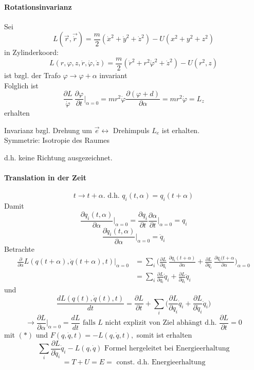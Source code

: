 \documentclass[titlepage,12pt,a4paper,ngerman]{report}
\newcommand{\tx}[1]{\textrm{#1}}
\newcommand{\rbox}[1]{\begin{tcolorbox}[colback=white,colframe=red!75!black]#1\end{tcolorbox}} %
\begin{document}
\paragraph{Rotationsinvarianz}
Sei $$L(\vec{r}, \vec{\dot r}) = \frac{m}{2}(\dot x^2 + \dot y^2 + \dot z^2) - U(x^2+y^2+z^2)$$
in Zylinderkoord: $$L(r, \varphi, z, \dot r, \dot \varphi, \dot z) = \frac{m}{2}(\dot r^2 + r^2 \dot \varphi^2 + \dot z^2) - U(r^2, z)$$
ist bzgl. der Trafo $\varphi \rightarrow \varphi + \alpha$ invariant\\
Folglich ist $$\frac{\partial L}{\dot \varphi}\ \frac{\partial \varphi}{\partial t} \bigg|_{\alpha = 0} = mr^2\dot \varphi \frac{\partial (\varphi+d)}{\partial \alpha} = mr^2 \dot \varphi = L_z$$ erhalten
\rbox{Invarianz bzgl. Drehung um $\vec{e} \leftrightarrow$ Drehimpuls $L_e$ ist erhalten.\\
	Symmetrie: Isotropie des Raumes}
d.h. keine Richtung ausgezeichnet.

\paragraph{Translation in der Zeit}
$$t \rightarrow t + \alpha. \tx{ d.h. } q_i(t,\alpha) = q_i (t+\alpha)$$
Damit $$\frac{\partial q_i(t,\alpha)}{\partial \alpha} \bigg|_{\alpha = 0} = \frac{\partial q_i}{\partial t}\frac{\partial \alpha}{\partial t}\bigg|_{\alpha = 0} = q_i$$
$$\frac{\partial \dot q_i (t,\alpha)}{\partial \alpha}\bigg|_{\alpha = 0} = \ddot q_i$$
Betrachte 
\begin{align*}
\frac{\partial}{\partial \alpha} L (q(t +\alpha), \dot q (t+ \alpha),t)\bigg|_{\alpha = 0} &= \sum_i \bigg( \frac{\partial L}{\partial q_i}\ \frac{\partial q_i(t+\alpha)}{\partial \alpha} + \frac{\partial L}{\partial \dot q_i}\ \frac{\partial \dot q_i(t+\alpha}{\partial \alpha}\bigg)_{\alpha = 0}\\ 
&= \sum_i \frac{\partial L}{\partial q_i} \dot q_i +\frac{\partial L}{\partial\dot q_i} \ddot q_i
\end{align*}
und $$\frac{dL(q(t),\dot q (t), t)}{dt} = \frac{\partial L}{\partial t} + \sum_i \bigg( \frac{\partial L}{\partial q_i} \dot q_i + \frac{\partial L}{\partial \dot q_i} \ddot q_i \bigg)$$
$$\rightarrow \frac{\partial L }{\partial \alpha}\bigg|_{\alpha = 0} = \frac{d L}{dt} \tx{ falls $L$ nicht explizit von Ziel abhängt d.h. } \frac{\partial L}{\partial t} = 0$$ 
mit $(*)$ und $F(q, \dot q, t) = -L (q, \dot q,t),$ somit ist erhalten
$$\sum_i \frac{\partial L}{\partial \dot q_i}\dot q_i - L (q, \dot q) \tx{ Formel hergeleitet bei Energieerhaltung}$$
$$= T + U = E = \tx{ const. d.h. Energieerhaltung}$$
\end{document}

